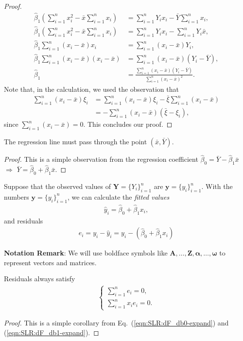 \documentclass{book}
\begin{document}
\begin{proof}
\begin{align*}
    \hat\beta_1 ( \sum_{i=1}^n x_i^2 - \bar{x} \sum_{i=1}^n x_i) &= \sum_{i=1}^nY_i x_i - \bar{Y} \sum_{i=1}^n x_i,\\
    \hat\beta_1 ( \sum_{i=1}^n x_i^2 - \bar{x} \sum_{i=1}^n x_i) &= \sum_{i=1}^nY_i x_i - \sum_{i=1}^n Y_i  \bar{x},\\
    \hat\beta_1 \sum_{i=1}^n (x_i - \bar{x}) x_i &= \sum_{i=1}^n(x_i - \bar{x})Y_i,\\
    \hat\beta_1 \sum_{i=1}^n (x_i - \bar{x}) (x_i - \bar{x}) &= \sum_{i=1}^n(x_i - \bar{x})(Y_i - \bar{Y}),\\
    \hat\beta_1 &= \frac{\sum_{i=1}^n(x_i - \bar{x})(Y_i - \bar{Y})}{\sum_{i=1}^n (x_i - \bar{x})^2}.
\end{align*}
Note that, in the calculation, we used the observation that
\begin{align*}
    \sum_{i=1}^n (x_i - \bar{x}) \xi_i &= \sum_{i=1}^n (x_i - \bar{x}) \xi_i - \bar{\xi}\sum_{i=1}^n (x_i - \bar{x})\\
    &= - \sum_{i=1}^n (x_i - \bar{x}) (\bar{\xi}-\xi_i),
\end{align*}
since $\sum_{i=1}^n (x_i - \bar{x}) = 0$. This concludes our proof.
\end{proof}

\corollary The regression line must pass through the point $(\bar{x}, \bar{Y})$.\\
\begin{proof}
This is a simple observation from the regression coefficient $\hat{\beta}_0 = \bar{Y} - \hat{\beta}_{1} \bar{x}$ $\Rightarrow$ $\bar{Y} = \hat{\beta}_0 + \hat{\beta}_{1} \bar{x}$.
\end{proof} 

Suppose that the observed values of $\mathbf{Y} = \{Y_i\}_{i=1}^n$ are $\mathbf{y} = \{y_i\}_{i=1}^n$. With the numbers $\mathbf{y} = \{y_i\}_{i=1}^n$, we can calculate the \textit{fitted values}
\begin{align}
    \hat{y}_i = \hat{\beta}_0 + \hat{\beta}_1 x_i,
\end{align}
and residuals
\begin{align}
    e_i = y_i - \hat{y}_i = y_i - (\hat{\beta}_0 + \hat{\beta}_1 x_i)
\end{align}

\noindent \textbf{Notation Remark}: We will use boldface symbols like $\mathbf{A},\dots ,\mathbf{Z},\boldsymbol{\alpha},\dots,\boldsymbol{\omega}$ to represent vectors and matrices.

\theorem Residuals always satisfy 
\begin{align}
    \begin{cases}
    \sum_{i=1}^{n} e_i = 0,\\
    \sum_{i=1}^{n} x_i e_i = 0.
    \end{cases}
\end{align}
\begin{proof}
This is a simple corollary from Eq.~(\ref{eqn:SLR:dF_db0-expand}) and (\ref{eqn:SLR:dF_db1-expand}).
\end{proof}
\end{document}
